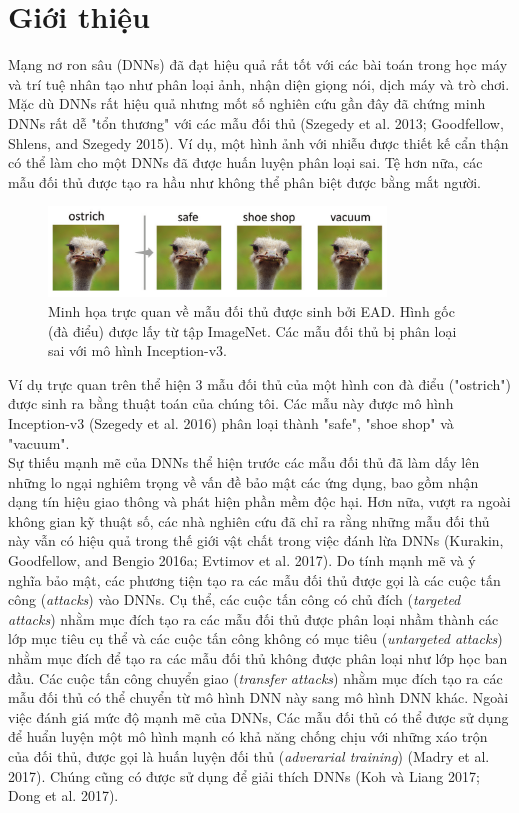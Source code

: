 \chapter{Giới thiệu}
Mạng nơ ron sâu (DNNs) đã đạt hiệu quả rất tốt với các bài toán trong học máy
và trí tuệ nhân tạo như phân loại ảnh, nhận diện giọng nói, dịch máy và trò chơi.
Mặc dù DNNs rất hiệu quả nhưng mốt số nghiên cứu gần đây đã chứng minh DNNs rất 
dễ  "tổn thương" với các mẫu đối thủ (Szegedy et al. 2013; Goodfellow, Shlens, 
and Szegedy 2015). Ví dụ, một hình ảnh với nhiễu được thiết kế cẩn thận có thể
làm cho một DNNs đã được huấn luyện phân loại sai. Tệ hơn nữa, các mẫu đối thủ
được tạo ra hầu như không thể phân biệt được bằng mắt người. 
\begin{figure}[H] %
    \centering %
    \includegraphics[width=0.8\textwidth]{assets/fig_01.png} 
    \caption{Minh họa trực quan về mẫu đối thủ được sinh bởi EAD. 
    Hình gốc (đà điểu) được lấy từ tập ImageNet. Các mẫu đối thủ bị 
    phân loại sai với mô hình Inception-v3.} %
    \label{fig:fg_01}
\end{figure}
Ví dụ trực quan trên thể hiện 3 mẫu đối thủ của một hình con đà điểu ("ostrich") 
được sinh ra bằng thuật toán của chúng tôi. Các mẫu này được mô hình Inception-v3 
(Szegedy et al. 2016) phân loại thành "safe", "shoe shop" và "vacuum". \\

Sự thiếu mạnh mẽ của DNNs thể hiện trước các mẫu đối thủ đã làm dấy lên những lo ngại 
nghiêm trọng về vấn đề bảo mật các ứng dụng, bao gồm nhận dạng tín hiệu giao thông 
và phát hiện phần mềm độc hại. Hơn nữa, vượt ra ngoài không gian kỹ thuật số, 
các nhà nghiên cứu đã chỉ ra rằng những mẫu đối thủ này vẫn có hiệu quả trong thế giới 
vật chất trong việc đánh lừa DNNs (Kurakin, Goodfellow, and Bengio 2016a; Evtimov et al. 2017).
Do tính mạnh mẽ và ý nghĩa bảo mật, các phương tiện tạo ra các mẫu đối thủ được gọi là 
các cuộc tấn công (\textit{attacks}) vào DNNs. Cụ thể, các cuộc tấn công có chủ đích 
(\textit{targeted attacks}) nhằm mục đích tạo ra các mẫu đối thủ được phân loại nhầm thành các lớp mục tiêu 
cụ thể và các cuộc tấn công không có mục tiêu (\textit{untargeted attacks}) nhằm mục đích 
để tạo ra các mẫu đối thủ không được phân loại như lớp học ban đầu. Các cuộc tấn công 
chuyển giao (\textit{transfer attacks}) nhằm mục đích tạo ra các mẫu đối thủ có thể chuyển 
từ mô hình DNN này sang mô hình DNN khác. Ngoài việc đánh giá mức độ mạnh mẽ của DNNs,
Các mẫu đối thủ có thể được sử dụng để huẩn luyện một mô hình mạnh có khả năng chống chịu 
với những xáo trộn của đối thủ, được gọi là huấn luyện đối thủ (\textit{adverarial training}) 
(Madry et al. 2017). Chúng cũng có được sử dụng để giải thích DNNs (Koh và Liang 2017;
Dong et al. 2017). \\



